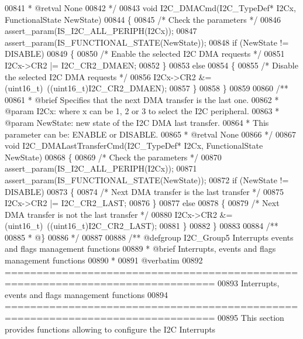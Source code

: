 \begin{DoxyCode}
00841 \textcolor{comment}{  * @retval None}
00842 \textcolor{comment}{  */}
00843 \textcolor{keywordtype}{void} I2C_DMACmd(I2C\_TypeDef* I2Cx, FunctionalState NewState)
00844 \{
00845   \textcolor{comment}{/* Check the parameters */}
00846   assert_param(IS\_I2C\_ALL\_PERIPH(I2Cx));
00847   assert_param(IS\_FUNCTIONAL\_STATE(NewState));
00848   \textcolor{keywordflow}{if} (NewState != DISABLE)
00849   \{
00850     \textcolor{comment}{/* Enable the selected I2C DMA requests */}
00851     I2Cx->CR2 |= I2C_CR2_DMAEN;
00852   \}
00853   \textcolor{keywordflow}{else}
00854   \{
00855     \textcolor{comment}{/* Disable the selected I2C DMA requests */}
00856     I2Cx->CR2 &= (uint16\_t)~((uint16\_t)I2C_CR2_DMAEN);
00857   \}
00858 \}
00859 
00860 \textcolor{comment}{/**}
00861 \textcolor{comment}{  * @brief  Specifies that the next DMA transfer is the last one.}
00862 \textcolor{comment}{  * @param  I2Cx: where x can be 1, 2 or 3 to select the I2C peripheral.}
00863 \textcolor{comment}{  * @param  NewState: new state of the I2C DMA last transfer.}
00864 \textcolor{comment}{  *          This parameter can be: ENABLE or DISABLE.}
00865 \textcolor{comment}{  * @retval None}
00866 \textcolor{comment}{  */}
00867 \textcolor{keywordtype}{void} I2C_DMALastTransferCmd(I2C\_TypeDef* I2Cx, FunctionalState NewState)
00868 \{
00869   \textcolor{comment}{/* Check the parameters */}
00870   assert_param(IS\_I2C\_ALL\_PERIPH(I2Cx));
00871   assert_param(IS\_FUNCTIONAL\_STATE(NewState));
00872   \textcolor{keywordflow}{if} (NewState != DISABLE)
00873   \{
00874     \textcolor{comment}{/* Next DMA transfer is the last transfer */}
00875     I2Cx->CR2 |= I2C_CR2_LAST;
00876   \}
00877   \textcolor{keywordflow}{else}
00878   \{
00879     \textcolor{comment}{/* Next DMA transfer is not the last transfer */}
00880     I2Cx->CR2 &= (uint16\_t)~((uint16\_t)I2C_CR2_LAST);
00881   \}
00882 \}
00883 
00884 \textcolor{comment}{/**}
00885 \textcolor{comment}{  * @\}}
00886 \textcolor{comment}{  */}
00887 
00888 \textcolor{comment}{/** @defgroup I2C\_Group5 Interrupts events and flags management functions}
00889 \textcolor{comment}{ *  @brief   Interrupts, events and flags management functions}
00890 \textcolor{comment}{ *}
00891 \textcolor{comment}{@verbatim   }
00892 \textcolor{comment}{ ===============================================================================}
00893 \textcolor{comment}{                Interrupts, events and flags management functions}
00894 \textcolor{comment}{ ===============================================================================  }
00895 \textcolor{comment}{  This section provides functions allowing to configure the I2C Interrupts }

\end{DoxyCode}
